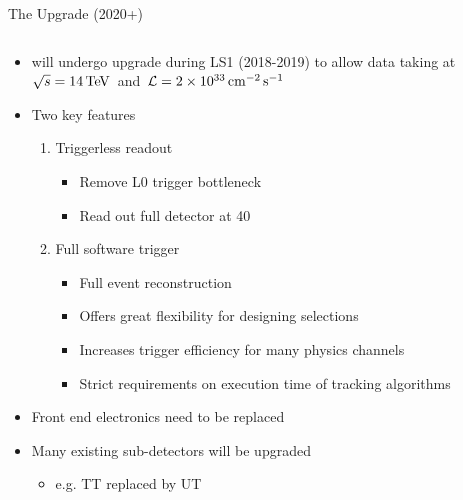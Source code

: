 \documentclass[aspectratio=1610]{beamer}
\begin{document}
\begin{frame}{The \lhcb Upgrade (2020+)}

\begin{columns}
\begin{column}{0.6\textwidth}
  \begin{itemize}
    \item \lhcb  will undergo upgrade during LS1 (2018-2019) to allow data taking at \mbox{$\protect\sqrt{s}=14\mathrm{\,Te\kern -0.1em V}$ and $\mathcal{L}=2\times10^{33}\mathrm{ \,cm}^{-2}\mathrm{{\,s}}^{-1}$}
  \end{itemize}

  \begin{itemize}
    \item Two key features
    \begin{enumerate}
      \item Triggerless readout
      \begin{itemize}
        \item[\ding{70}] Remove L0 trigger bottleneck
        \item[\ding{70}] Read out full detector at 40\mhz
      \end{itemize}
      \item Full software trigger
      \begin{itemize}
        \item[\ding{70}] Full event reconstruction
        \item[\ding{70}] Offers great flexibility for designing selections
        \item[\ding{70}] Increases trigger efficiency for many physics channels
        \item[\ding{80}] Strict requirements on execution time of tracking algorithms
      \end{itemize}
    \end{enumerate}
  \end{itemize}

  \begin{itemize}
    \item Front end electronics need to be replaced
    \item Many existing sub-detectors will be upgraded
    \begin{itemize}
        \item[\ding{70}] e.g. TT replaced by UT
      \end{itemize}
  \end{itemize}


\end{column}
\end{columns}
\end{frame}
\end{document}
